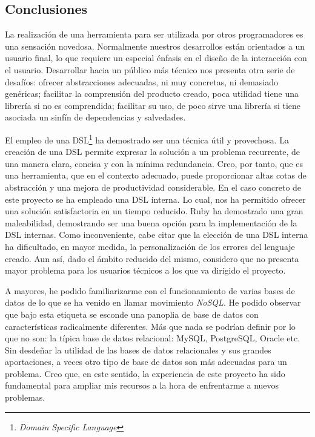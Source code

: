 \subsection{Conclusiones}

La realización de una herramienta para ser utilizada por otros
programadores es una sensación novedosa. Normalmente nuestros
desarrollos están orientados a un usuario final, lo que requiere un
especial énfasis en el diseño de la interacción con el usuario.
Desarrollar hacia un público más técnico nos presenta otra serie de
desafíos: ofrecer abstracciones adecuadas, ni muy concretas, ni
demasiado genéricas; facilitar la comprensión del producto creado,
poca utilidad tiene una librería si no es comprendida; facilitar su
uso, de poco sirve una librería si tiene asociada un sinfín de
dependencias y salvedades.

El empleo de una DSL\footnote{\emph{Domain Specific Language}} ha
demostrado ser una técnica útil y provechosa. La creación de una DSL
permite expresar la solución a un problema recurrente, de una manera
clara, concisa y con la mínima redundancia. Creo, por tanto, que es
una herramienta, que en el contexto adecuado, puede proporcionar altas
cotas de abstracción y una mejora de productividad considerable. En el
caso concreto de este proyecto se ha empleado una DSL interna. Lo
cual, nos ha permitido ofrecer una solución satisfactoria en un tiempo
reducido. Ruby ha demostrado una gran maleabilidad, demostrando ser
una buena opción para la implementación de la DSL internas. Como
inconveniente, cabe citar que la elección de una DSL interna ha
dificultado, en mayor medida, la personalización de los errores del
lenguaje creado. Aun así, dado el ámbito reducido del mismo, considero
que no presenta mayor problema para los usuarios técnicos a los que va
dirigido el proyecto.

A mayores, he podido familiarizarme con el funcionamiento de varias
bases de datos de lo que se ha venido en llamar movimiento
\emph{NoSQL}. He podido observar que bajo esta etiqueta se esconde
una panoplia de base de datos con características radicalmente
diferentes. Más que nada se podrían definir por lo que no son: la
típica base de datos relacional: MySQL, PostgreSQL, Oracle etc.
Sin desdeñar la utilidad de las bases de datos relacionales y sus
grandes aportaciones, a veces otro tipo de base de datos son más
adecuadas para un problema. Creo que, en este sentido, la experiencia
de este proyecto ha sido fundamental para ampliar mis recursos a la
hora de enfrentarme a nuevos problemas.

